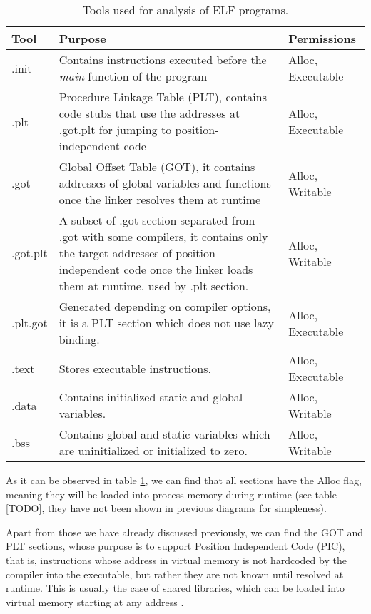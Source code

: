 \begin{table}[htbp]
\begin{tabular}{|>{\centering\arraybackslash}p{1cm}|>{\centering\arraybackslash}p{9cm}|>{\centering\arraybackslash}p{2cm}|}
\hline
Tool & Purpose & Permissions\\
\hline
\hline
.init & Contains instructions executed before the \textit{main} function of the program & Alloc, Executable\\
\hline
.plt & Procedure Linkage Table (PLT), contains code stubs that use the addresses at .got.plt for jumping to position-independent code & Alloc, Executable\\
\hline
.got & Global Offset Table (GOT), it contains addresses of global variables and functions once the linker resolves them at runtime & Alloc, Writable\\
\hline
.got.plt & A subset of .got section separated from .got with some compilers, it contains only the target addresses of position-independent code once the linker loads them at runtime, used by .plt section. & Alloc, Writable\\
\hline
.plt.got & Generated depending on compiler options, it is a PLT section which does not use lazy binding. & Alloc, Executable\\
\hline
.text & Stores executable instructions. & Alloc, Executable\\
\hline
.data & Contains initialized static and global variables. & Alloc, Writable\\
\hline
.bss & Contains global and static variables which are uninitialized or initialized to zero. & Alloc, Writable\\
\hline 
\end{tabular}
\caption{Tools used for analysis of ELF programs.}
\label{table:elf_sec_headers}
\end{table}

As it can be observed in table \ref{table:elf_sec_headers}, we can find that all sections have the Alloc flag, meaning they will be loaded into process memory during runtime (see table \ref{TODO}, they have not been shown in previous diagrams for simpleness). 

Apart from those we have already discussed previously, we can find the GOT and PLT sections, whose purpose is to support Position Independent Code (PIC), that is, instructions whose address in virtual memory is not hardcoded by the compiler into the executable, but rather they are not known until resolved at runtime. This is usually the case of shared libraries, which can be loaded into virtual memory starting at any address \cite{plt_got_overlord}.

